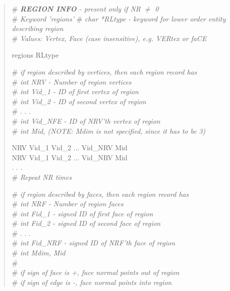 \documentclass[12pt]{article}
\begin{document}
\begin{verse}
\# \textit{\textbf{REGION INFO} - present only if NR $\ne$ 0} \\
\# \textit{Keyword 'regions'}
\# \textit{char *RLtype - keyword for lower order entity describing region} \\
\# \textit{Values: Vertex, Face (case insensitive), e.g. VERtex or faCE}
\vspace{1ex}

regions RLtype
\vspace{1ex}

\# \textit{if region described by vertices, then each region record has} \\
\# \textit{\textit{int} NRV - Number of region vertices} \\
\# \textit{\textit{int} Vid\_1 - ID of first vertex of region} \\
\# \textit{\textit{int} Vid\_2 - ID of second vertex of region} \\
\# . . . \\
\# \textit{\textit{int} Vid\_NFE - ID of NRV'th vertex of region} \\
\# \textit{\textit{int} Mid, (NOTE: Mdim is not specified, since it has to be 3)}
\vspace{1ex}

NRV \hspace{0.5ex} Vid\_1 \hspace{0.5ex} Vid\_2 \hspace{0.5ex} ... \hspace{0.5ex} Vid\_NRV \hspace{0.5ex} Mid \\
NRV \hspace{0.5ex} Vid\_1 \hspace{0.5ex} Vid\_2 \hspace{0.5ex} ... \hspace{0.5ex} Vid\_NRV \hspace{0.5ex} Mid \\
. . . \\
\# \textit{Repeat NR times} 
\vspace{3ex}

\# \textit{if region described by faces, then each region record has} \\
\# \textit{\textit{int} NRF - Number of region faces} \\
\# \textit{\textit{int} Fid\_1 - signed ID of first face of region} \\
\# \textit{\textit{int} Fid\_2 - signed ID of second face of region} \\
\# . . . \\
\# \textit{\textit{int} Fid\_NRF - signed ID of NRF'th face of region} \\
\# \textit{\textit{int} Mdim, Mid} \\
\#  \\
\# \textit{if sign of face is +, face normal points out of region} \\
\# \textit{if sign of edge is -, face normal points into region}
\vspace{1ex}


\end{verse}
\end{document}
